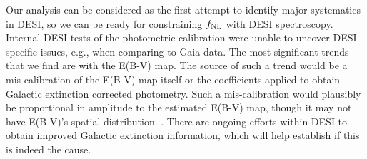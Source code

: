 Our analysis can be considered as the first attempt to identify major systematics in DESI, so we can be ready for constraining $f_{\rm NL}$ with DESI spectroscopy. Internal DESI tests of the photometric calibration were unable to uncover DESI-specific issues, e.g., when comparing to Gaia data. The most significant trends that we find are with the E(B-V) map. The source of such a trend would be a mis-calibration of the E(B-V) map itself or the coefficients applied to obtain Galactic extinction corrected photometry. Such a mis-calibration would plausibly be proportional in amplitude to the estimated E(B-V) map, though it may not have E(B-V)’s spatial distribution. . There are ongoing efforts within DESI to obtain improved Galactic extinction information, which will help establish if this is indeed the cause.  
